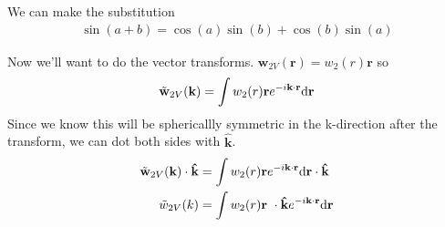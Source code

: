 \documentclass[letterpaper,twocolumn,amsmath,amssymb,prb]{revtex4-1}
\newcommand{\red}[1]{{\color{red} #1}}
\newcommand{\rr}{\textbf{r}}
\newcommand{\kk}{\textbf{k}}
\newcommand{\fixme}[1]{\red{[#1]}}
\begin{document}
We can make the substitution 
\begin{align}
  \sin \left(a + b\right) = \cos(a)\sin(b) + \cos(b)\sin(a)
\end{align}

Now we'll want to do the vector transforms. $\mathbf{w}_{2V}(\rr) = w_2(r)\rr$ so
\begin{align}
  \tilde{\mathbf{w}}_{2V}(\kk) &= \int w_2(r)\rr e^{-i\kk \cdot \rr}
  \textrm{d\rr} \\
\end{align}
Since we know this will be sphericallly symmetric in the k-direction
after the transform, we can dot both sides with $\mathbf{\hat{k}}$.
\begin{align}
  \tilde{\mathbf{w}}_{2V}(\kk)\cdot \mathbf{\hat{k}} &= \int w_2(r)\rr e^{-i\kk \cdot \rr}
  \textrm{d\rr} \cdot \mathbf{\hat{k}} \\
  \tilde{w}_{2V}(k) &= \int w_2(r)\rr\ \cdot \mathbf{\hat{k}} e^{-i\kk \cdot \rr}
  \textrm{d\rr} \\
\end{align}
\end{document}

